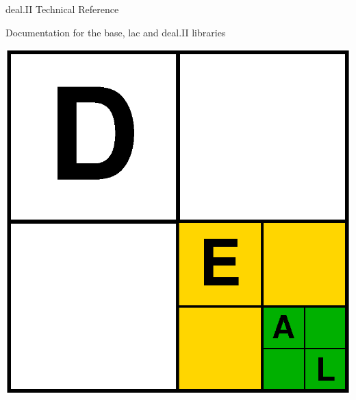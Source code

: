\documentclass{report}
\begin{document}

\sbox{\cxxHeadName}{}

\vspace*{3cm}

\begin{center}
  {\Huge deal.II Technical Reference}

\vspace*{1cm}

  {\LARGE Documentation for the \textsf{base},
  \textsf{lac} and \textsf{deal.II} libraries}

\vspace*{1.5cm}

\includegraphics[width=.8\textwidth]{../../pictures/deal.eps}
\end{center}


\tableofcontents
\end{document}
